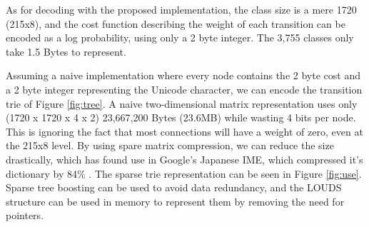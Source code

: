 As for decoding with the proposed implementation, the class size is a mere 1720 (215x8), and the cost function describing the weight of each transition can be encoded as a log probability, using only a 2 byte integer. The 3,755 classes only take 1.5 Bytes to represent.


Assuming a naive implementation where every node contains the 2 byte cost and a 2 byte integer representing the Unicode character, we can encode the transition trie of Figure \ref{fig:tree}. A naive two-dimensional matrix representation uses only (1720 x 1720 x 4 x 2) 23,667,200 Bytes (23.6MB) while wasting 4 bits per node. This is ignoring the fact that most connections will have a weight of zero, even at the 215x8 level. By using spare matrix compression, we can reduce the size drastically, which has found use in Google's Japanese IME, which compressed it's dictionary by 84\% \cite{ime-compression}.
The sparse trie representation can be seen in Figure \ref{fig:use}. Sparse tree boosting \cite{sparse-tree-boosting} can be used to avoid data redundancy, and the LOUDS structure \cite{louds-structure} can be used in memory to represent them by removing the need for pointers.
